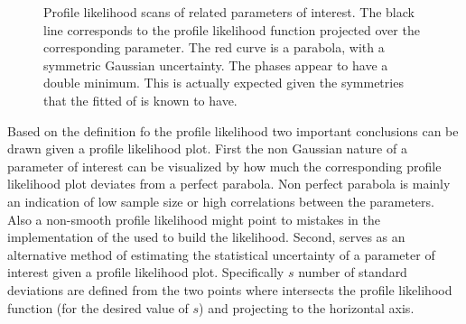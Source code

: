 \begin{figure}[!t]
  \centering
  \begin{subfigure}{0.5\textwidth}
    \raggedright
    \scalebox{0.56}{}
    \caption{}
    \label{nll_f0}
  \end{subfigure}%
  \hfill%
  \begin{subfigure}{0.5\textwidth}
    \raggedleft
    \scalebox{0.56}{}
    \caption{}
    \label{nll_fpar}
  \end{subfigure}
  \begin{subfigure}{0.5\textwidth}
    \raggedright
    \scalebox{0.56}{}
    \caption{}
    \label{nll_AparPhase}
  \end{subfigure}%
  \hfill%
  \begin{subfigure}{0.5\textwidth}
    \raggedleft
    \scalebox{0.56}{}
    \caption{}
    \label{nll_AperpPhase}
  \end{subfigure}
\caption{Profile likelihood scans of \pwave related parameters of interest. The black line corresponds to the profile likelihood
         function projected over the corresponding parameter. The red curve is a parabola, with a symmetric Gaussian
         uncertainty. The phases appear to have a double minimum. This is actually expected given the symmetries that the fitted \pdf
         of  is known to have.}
\end{figure}

Based on the definition fo the profile likelihood two important conclusions can be drawn given a profile likelihood plot. First the non
Gaussian nature of a parameter of interest can be visualized by how much the corresponding profile likelihood plot deviates from
a perfect parabola. Non perfect parabola is mainly an indication of low sample size or high correlations between the parameters.
Also a non-smooth profile likelihood might point to mistakes in the implementation of the \pdf
used to build the likelihood. Second,  serves as an alternative method of estimating the statistical uncertainty
of a parameter of interest given a profile likelihood plot. Specifically $s$ number of standard deviations are defined from the two
points where  intersects the profile likelihood function (for the desired value of $s$) and projecting to
the horizontal axis.

